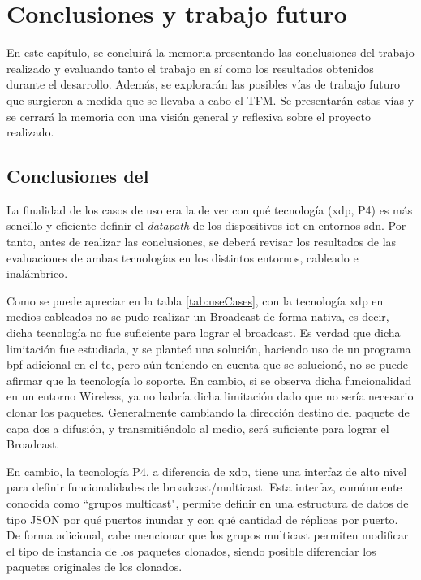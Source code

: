 \chapter{Conclusiones y trabajo futuro}
\label{conclusiones}

En este capítulo, se concluirá la memoria presentando las conclusiones del trabajo realizado y evaluando tanto el trabajo en sí como los resultados obtenidos durante el desarrollo. Además, se explorarán las posibles vías de trabajo futuro que surgieron a medida que se llevaba a cabo el TFM. Se presentarán estas vías y se cerrará la memoria con una visión general y reflexiva sobre el proyecto realizado.


\section{Conclusiones del }

La finalidad de los casos de uso era la de ver con qué tecnología (\gls{xdp}, P4) es más sencillo y eficiente definir el \textit{datapath} de los dispositivos \gls{iot} en entornos \gls{sdn}. Por tanto, antes de realizar las conclusiones, se deberá revisar los resultados de las evaluaciones de ambas tecnologías en los distintos entornos, cableado e inalámbrico. \\
\par
Como se puede apreciar en la tabla \ref{tab:useCases}, con la tecnología \gls{xdp} en medios cableados no se pudo realizar un Broadcast de forma nativa, es decir, dicha tecnología no fue suficiente para lograr el broadcast. Es verdad que dicha limitación fue estudiada, y se planteó una solución, haciendo uso de un programa \gls{bpf} adicional en el \gls{tc}, pero aún teniendo en cuenta que se solucionó, no se puede afirmar que la tecnología lo soporte.  En cambio, si se observa dicha funcionalidad en un entorno Wireless, ya no habría dicha limitación dado que no sería necesario clonar los paquetes. Generalmente cambiando la dirección destino del paquete de capa dos a difusión, y transmitiéndolo al medio, será suficiente para lograr el Broadcast. \\
\par

En cambio, la tecnología P4, a diferencia de \gls{xdp}, tiene una interfaz de alto nivel para definir funcionalidades de broadcast/multicast. Esta interfaz, comúnmente conocida como ``grupos multicast", permite definir en una estructura de datos de tipo JSON por qué puertos inundar y con qué cantidad de réplicas por puerto. De forma adicional, cabe mencionar que los grupos multicast permiten modificar el tipo de instancia de los paquetes clonados, siendo posible diferenciar los paquetes originales de los clonados. \\
\par

